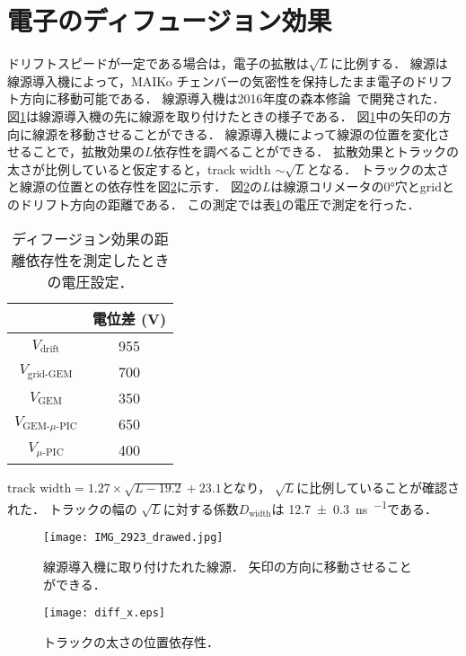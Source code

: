 \documentclass[../master]{subfiles}
\begin{document}
\section{電子のディフュージョン効果}
ドリフトスピードが一定である場合は，電子の拡散は$\sqrt{L}$に比例する．
線源は線源導入機によって，MAIKo チェンバーの気密性を保持したまま電子のドリフト方向に移動可能である．
線源導入機は2016年度の森本修論~\cite{morimoto_thesis}で開発された．
図\ref{pic::source_insirtion}は線源導入機の先に線源を取り付けたときの様子である．
図\ref{pic::source_insirtion}中の矢印の方向に線源を移動させることができる．
線源導入機によって線源の位置を変化させることで，拡散効果の$L$依存性を調べることができる．
拡散効果とトラックの太さが比例していると仮定すると，track width $\sim\sqrt{L}$となる．
トラックの太さと線源の位置との依存性を図\ref{fig::diff_x}に示す．
図\ref{fig::diff_x}の$L$は線源コリメータの\ang{0}穴とgridとのドリフト方向の距離である．
この測定では表\ref{tab::config_diffusion_meas}の電圧で測定を行った．
\begin{table}
  \centering
  \caption{ディフージョン効果の距離依存性を測定したときの電圧設定．}
  \label{tab::config_diffusion_meas}
  \begin{tabular}{cc}
    \toprule
    & 電位差 (\si{\volt}) \\
    \midrule
    $V_{\text{drift}}$ & 955 \\
    $V_{\text{grid-GEM}}$ & 700 \\
    $V_{\text{GEM}}$ & 350 \\
    $V_{\text{GEM-$\mu$-PIC}}$ & 650 \\
    $V_{\mu\text{-PIC}}$ & 400 \\
    \bottomrule
  \end{tabular}
\end{table}

$\text{track width} = 1.27\times\sqrt{L-19.2}+23.1$となり，
$\sqrt{L}$に比例していることが確認された．
トラックの幅の $\sqrt{L}$に対する係数$D_{\text{width}}$は
\SI{12.7\pm0.3}{\nano\second\per\sqrt{\milli\metre}}である．
\begin{figure}
  \centering
  \texttt{[image: IMG\_2923\_drawed.jpg]}
  \caption[線源導入機に取り付けたれた線源．]
          {線源導入機に取り付けたれた線源．
          矢印の方向に移動させることができる．}
  \label{pic::source_insirtion}
\end{figure}
\begin{figure}
  \centering
  \texttt{[image: diff\_x.eps]}
  \caption{トラックの太さの位置依存性．}
  \label{fig::diff_x}
\end{figure}
\end{document}

